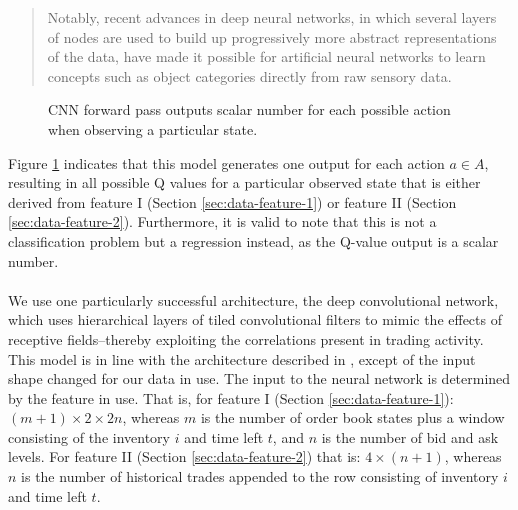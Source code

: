 \begin{quote}
Notably, recent advances in deep neural networks, in which several layers of nodes are used to build up progressively more abstract representations of the data, have made it possible for artificial neural networks to learn concepts such as object categories directly from raw sensory data.\cite{mnih2015human}
\end{quote}

\begin{figure}[H]
    \centering
    \caption{CNN forward pass outputs scalar number for each possible action when observing a particular state.}
    \label{fig:setup-cnn-output}
\end{figure}
Figure \ref{fig:setup-cnn-output} indicates that this model generates one output for each action $a \in A$, resulting in all possible Q values for a particular observed state that is either derived from feature I (Section \ref{sec:data-feature-1}) or feature II (Section \ref{sec:data-feature-2}).
Furthermore, it is valid to note that this is not a classification problem but a regression instead, as the Q-value output is a scalar number.
\\
\\
We use one particularly successful architecture, the deep convolutional network\cite{cnn}, which uses hierarchical layers of tiled convolutional filters to mimic the effects of receptive fields--thereby exploiting the correlations present in trading activity.
This model is in line with the architecture described in \cite{mnih2013playing}, except of the input shape changed for our data in use.
The input to the neural network is determined by the feature in use.
That is, for feature I (Section \ref{sec:data-feature-1}): $(m+1) \times 2 \times 2n$, whereas $m$ is the number of order book states plus a window consisting of the inventory $i$ and time left $t$, and $n$ is the number of bid and ask levels.
For feature II (Section \ref{sec:data-feature-2}) that is: $4 \times (n+1)$, whereas $n$ is the number of historical trades appended to the row consisting of inventory $i$ and time left $t$.
